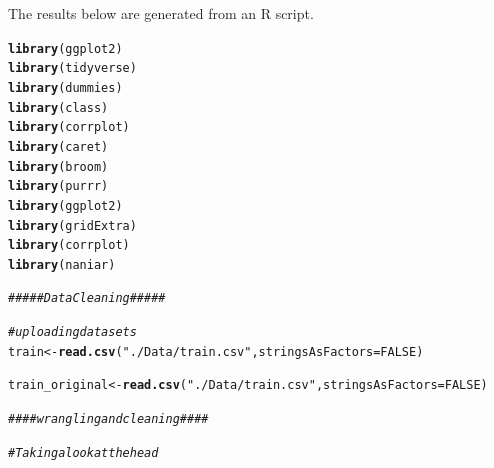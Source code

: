 \documentclass{article}\usepackage[]{graphicx}\usepackage[]{color}
\makeatletter
\newcommand{\hlnum}[1]{\textcolor[rgb]{0.686,0.059,0.569}{#1}}%
\newcommand{\hlstr}[1]{\textcolor[rgb]{0.192,0.494,0.8}{#1}}%
\newcommand{\hlcom}[1]{\textcolor[rgb]{0.678,0.584,0.686}{\textit{#1}}}%
\newcommand{\hlstd}[1]{\textcolor[rgb]{0.345,0.345,0.345}{#1}}%
\newcommand{\hlkwb}[1]{\textcolor[rgb]{0.69,0.353,0.396}{#1}}%
\newcommand{\hlkwc}[1]{\textcolor[rgb]{0.333,0.667,0.333}{#1}}%
\newcommand{\hlkwd}[1]{\textcolor[rgb]{0.737,0.353,0.396}{\textbf{#1}}}%
\newenvironment{kframe}{%
 \def\at@end@of@kframe{}%
 \ifinner\ifhmode%
  \def\at@end@of@kframe{\end{minipage}}%
  \begin{minipage}{\columnwidth}%
 \fi\fi%
 \def\FrameCommand##1{\hskip\@totalleftmargin \hskip-\fboxsep
 \colorbox{shadecolor}{##1}\hskip-\fboxsep
     \hskip-\linewidth \hskip-\@totalleftmargin \hskip\columnwidth}%
 \MakeFramed {\advance\hsize-\width
   \@totalleftmargin\z@ \linewidth\hsize
   \@setminipage}}%
 {\par\unskip\endMakeFramed%
 \at@end@of@kframe}
\newenvironment{knitrout}{}{} %
\makeatother
\begin{document}
\title{\title{\title{\title{\title{}}}}}



\maketitle
The results below are generated from an R script.

\begin{knitrout}
\color{fgcolor}\begin{kframe}
\begin{alltt}
\hlkwd{library}\hlstd{(ggplot2)}
\hlkwd{library}\hlstd{(tidyverse)}
\hlkwd{library}\hlstd{(dummies)}
\hlkwd{library}\hlstd{(class)}
\hlkwd{library}\hlstd{(corrplot)}
\hlkwd{library}\hlstd{(caret)}
\hlkwd{library}\hlstd{(broom)}
\hlkwd{library}\hlstd{(purrr)}
\hlkwd{library}\hlstd{(ggplot2)}
\hlkwd{library}\hlstd{(gridExtra)}
\hlkwd{library}\hlstd{(corrplot)}
\hlkwd{library}\hlstd{(naniar)}


\hlcom{##### Data Cleaning#####}


\hlcom{# uploading data sets}
\hlstd{train} \hlkwb{<-} \hlkwd{read.csv}\hlstd{(}\hlstr{"./Data/train.csv"}\hlstd{,} \hlkwc{stringsAsFactors} \hlstd{=} \hlnum{FALSE}\hlstd{)}
\end{alltt}


{\ttfamily\noindent{}}

{\ttfamily\noindent\bfseries{}}\begin{alltt}
\hlstd{train_original} \hlkwb{<-} \hlkwd{read.csv}\hlstd{(}\hlstr{"./Data/train.csv"}\hlstd{,} \hlkwc{stringsAsFactors} \hlstd{=} \hlnum{FALSE}\hlstd{)}
\end{alltt}


{\ttfamily\noindent{}}

{\ttfamily\noindent\bfseries{}}\begin{alltt}
\hlcom{#### wrangling and cleaning ####}

\hlcom{# Taking a look at the head}


\end{alltt}
\end{kframe}
\end{knitrout}
\end{document}
